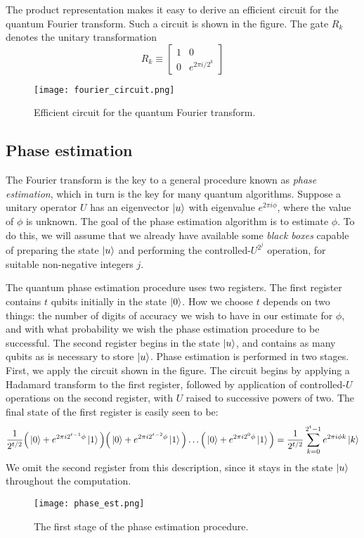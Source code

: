 The product representation makes it easy to derive an efficient circuit for the quantum Fourier transform. Such a circuit is shown in the figure. The gate $R_k$ denotes the unitary transformation
$$R_k \equiv \begin{bmatrix}1&0\\0&e^{2\pi i/2^k}\end{bmatrix}$$
\begin{figure}[h]
    \centering
    \texttt{[image: fourier\_circuit.png]}
    \caption{Efficient circuit for the quantum Fourier transform.}
\end{figure}

\subsection{Phase estimation}

The Fourier transform is the key to a general procedure known as \textit{phase estimation}, which in turn is the key for many quantum algorithms. Suppose a unitary operator $U$ has an eigenvector $\ket{u}$ with eigenvalue $e^{2\pi i\phi}$, where the value of $\phi$ is unknown. The goal of the phase estimation algorithm is to estimate $\phi$. To do this, we will assume that we already have available some \textit{black boxes} capable of preparing the state $\ket{u}$ and performing the controlled-$U^2^j$ operation, for suitable non-negative integers $j$.
\vspace{1em}

The quantum phase estimation procedure uses two registers. The first register contains $t$ qubits initially in the state $\ket{0}$. How we choose $t$ depends on two things: the number of digits of accuracy we wish to have in our estimate for $\phi$, and with what probability we wish the phase estimation procedure to be successful. The second register begins in the state $\ket{u}$, and contains as many qubits as is necessary to store $\ket{u}$. Phase estimation is performed in two stages. First, we apply the circuit shown in the figure. The circuit begins by applying a Hadamard transform to the first register, followed by application of controlled-$U$ operations on the second register, with $U$ raised to successive powers of two. The final state of the first register is easily seen to be:
$$\frac{1}{2^{t/2}}\Big(\ket{0} + e^{2\pi i2^{t-1}\phi}\ket{1}\Big)\Big(\ket{0} + e^{2\pi i2^{t-2}\phi}\ket{1}\Big)\dots\Big(\ket{0} + e^{2\pi i2^{0}\phi}\ket{1}\Big)
= \frac{1}{2^{t/2}}\sum_{k=0}^{2^t-1}{e^{2\pi i\phi k}\ket{k}}$$
We omit the second register from this description, since it stays in the state $\ket{u}$ throughout the computation.
\begin{figure}[h]
    \centering
    \texttt{[image: phase\_est.png]}
    \caption{The first stage of the phase estimation procedure.}
\end{figure}
\vspace{1em}

